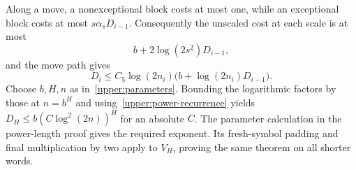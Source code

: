 Along a move, a nonexceptional block costs at most one, while an
exceptional block costs at most $s\alpha_sD_{i-1}$. Consequently the
unscaled cost at each scale is at most
\begin{equation}\label{upper:tv-move}
 b+2\log(2s^2)D_{i-1},
\end{equation}
and the move path gives
\begin{equation}\label{upper:tv-recurrence}
 D_i\le C_5\log(2n_i)\bigl(b+\log(2n_i)D_{i-1}\bigr).
\end{equation}
Choose $b,H,n$ as in~\eqref{upper:parameters}. Bounding the logarithmic
factors by those at $n=b^H$ and using~\eqref{upper:power-recurrence}
yields $D_H\le b(C\log^2(2n))^H$ for an absolute $C$.
The parameter calculation in the power-length proof gives the required
exponent. Its fresh-symbol padding and final multiplication by two apply
to $V_H$, proving the same theorem on all shorter words.
